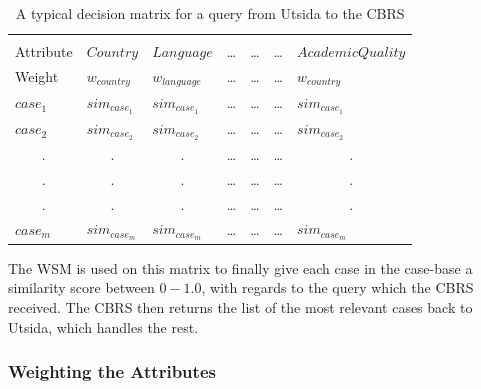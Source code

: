 \begin{table}[h]
\centering
\caption{A typical decision matrix for a query from Utsida to the CBRS}
\label{tab:decision_matrix}
\begin{tabular}{lllcccl}
                      &                       &                       & \multicolumn{1}{l}{} & \multicolumn{1}{l}{} & \multicolumn{1}{l}{} &                       \\
Attribute             & $Country$             & $Language$            & \ldots               & \ldots               & \ldots               & $AcademicQuality$     \\\hline
Weight                & $w_{country}$         & $w_{language}$        & \ldots               & \ldots               & \ldots               & $w_{country}$         \\\hline
$case_{1}$            & $sim_{case_{1}}$      & $sim_{case_{1}}$      & \ldots               & \ldots               & \ldots               & $sim_{case_{1}}$      \\
$case_{2}$            & $sim_{case_{2}}$      & $sim_{case_{2}}$      & \ldots               & \ldots               & \ldots               & $sim_{case_{2}}$      \\
\multicolumn{1}{c}{.} & \multicolumn{1}{c}{.} & \multicolumn{1}{c}{.} & \ldots               & \ldots               & \ldots               & \multicolumn{1}{c}{.} \\
\multicolumn{1}{c}{.} & \multicolumn{1}{c}{.} & \multicolumn{1}{c}{.} & \ldots               & \ldots               & \ldots               & \multicolumn{1}{c}{.} \\
\multicolumn{1}{c}{.} & \multicolumn{1}{c}{.} & \multicolumn{1}{c}{.} & \ldots               & \ldots               & \ldots               & \multicolumn{1}{c}{.} \\
$case_{m}$            & $sim_{case_{m}}$      & $sim_{case_{m}}$      & \ldots               & \ldots               & \ldots               & $sim_{case_{m}}$     
\end{tabular}
\end{table}

The WSM is used on this matrix to finally give each case in the case-base a similarity score between $0-1.0$, with regards to the query which the CBRS received. The CBRS then returns the list of the most relevant cases back to Utsida, which handles the rest.


\subsubsection{Weighting the Attributes}

